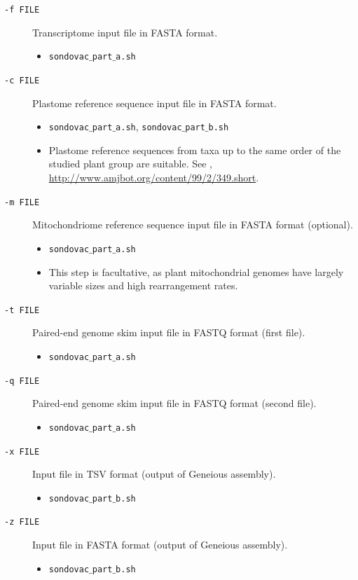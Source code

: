 \documentclass[a4paper, 11pt, twoside]{article}
\begin{document}
\begin{description}
\item[\texttt{-f FILE}] Transcriptome input file in FASTA format.
  \begin{itemize}
    \item \texttt{sondovac$\_$part$\_$a.sh}
  \end{itemize}
\item[\texttt{-c FILE}] Plastome reference sequence input file in FASTA format.
  \begin{itemize}
    \item \texttt{sondovac$\_$part$\_$a.sh}, \texttt{sondovac$\_$part$\_$b.sh}
    \item Plastome reference sequences from taxa up to the same order of the studied plant group are suitable. See \citet{Straub2012}, \href{http://www.amjbot.org/content/99/2/349.short}{http://www.amjbot.org/content/99/2/349.short}.
  \end{itemize}
\item[\texttt{-m FILE}] Mitochondriome reference sequence input file in FASTA format (optional).
  \begin{itemize}
    \item \texttt{sondovac$\_$part$\_$a.sh}
    \item This step is facultative, as plant mitochondrial genomes have largely variable sizes and high rearrangement rates.
  \end{itemize}
\item[\texttt{-t FILE}] Paired-end genome skim input file in FASTQ format (first file).
  \begin{itemize}
    \item \texttt{sondovac$\_$part$\_$a.sh}
  \end{itemize}
\item[\texttt{-q FILE}] Paired-end genome skim input file in FASTQ format (second file).
  \begin{itemize}
    \item \texttt{sondovac$\_$part$\_$a.sh}
  \end{itemize}
\item[\texttt{-x FILE}] Input file in TSV format (output of Geneious assembly).
  \begin{itemize}
    \item \texttt{sondovac$\_$part$\_$b.sh}
  \end{itemize}
\item[\texttt{-z FILE}] Input file in FASTA format (output of Geneious assembly).
  \begin{itemize}
    \item \texttt{sondovac$\_$part$\_$b.sh}
  \end{itemize}
\end{description}
\end{document}
